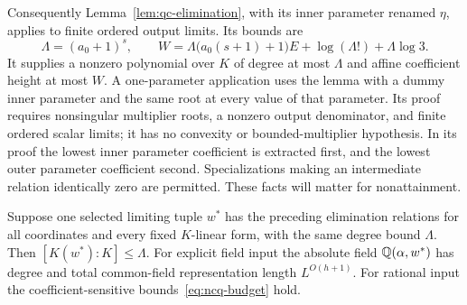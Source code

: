 Consequently Lemma~\ref{lem:qc-elimination}, with its inner parameter
renamed $\eta$, applies to finite ordered output limits. Its bounds are
\begin{equation}
\label{eq:ncq-elimination-budget}
 \Lambda=(a_0+1)^s,\qquad
 W=\Lambda\bigl(a_0(s+1)+1\bigr)E+\log(\Lambda!)+\Lambda\log3.
\end{equation}
It supplies a nonzero polynomial over $K$ of degree at most $\Lambda$
and affine coefficient height at most $W$. A one-parameter application
uses the lemma with a dummy inner parameter and the same root at every
value of that parameter. Its proof requires nonsingular multiplier roots,
a nonzero output denominator, and finite ordered scalar limits; it has no
convexity or bounded-multiplier hypothesis. In its proof the lowest inner
parameter coefficient is extracted first, and the lowest outer parameter
coefficient second. Specializations making an intermediate relation
identically zero are permitted. These facts will matter for nonattainment.

\begin{lemma}
\label{lem:ncq-common-field}
Suppose one selected limiting tuple $w^*$ has the preceding elimination
relations for all coordinates and every fixed $K$-linear form, with the
same degree bound $\Lambda$. Then $[K(w^*):K]\le\Lambda$. For explicit
field input the absolute field $\mathbb Q(\alpha,w^*)$ has degree and total
common-field representation length $L^{O(h+1)}$. For rational input the
coefficient-sensitive bounds~\eqref{eq:ncq-budget} hold.
\end{lemma}

